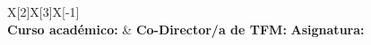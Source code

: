 {\begin{center}
\begin{covertbl}{X[2]X[3]X[-1]}
          \\

        \textbf{Curso académico:} \curso    &
            \def\temp{}\ifx\temp\dirige   \else
                \textbf{Co-Director/a de TFM:} \linebreak \hspace*{30pt} \codirige
            \fi
            \def\temp{}\ifx\temp\asignatura   \else
                \textbf{Asignatura:} \asignatura
            \fi
          \\
    \end{covertbl}
\end{center}



\vspace{2cm}

\restoregeometry
\clearpage
\pagecolor{white}

} %